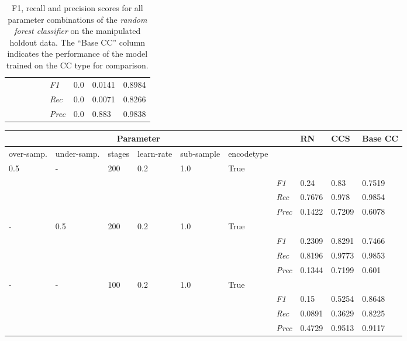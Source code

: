 \begin{table}[H]
\begin{tabularx}{\textwidth}{XXXXX|X|X|X|X}
    & & & & & \textit{F1} & 0.0 & 0.0141    & 0.8984    \\
    & & & & & \textit{Rec} &  0.0 & 0.0071 & 0.8266   \\
    & & & & & \textit{Prec} & 0.0 & 0.883 & 0.9838 \\ \midrule
    \end{tabularx}
    \caption{F1, recall and precision scores for all parameter combinations of the \textit{random forest classifier} on the manipulated holdout data. The \enquote{Base CC} column indicates the performance of the model trained on the CC type for comparison. }
    \label{tab:rq3_random_forest}
    \end{table}
    
    \begin{table}[H]
    \tiny
    \tabcolsep=0.11cm
    \begin{tabularx}{\textwidth}{XXXXXX|X|X|X|X}
    \toprule
    \multicolumn{6}{c}{Parameter} & & RN &  CCS & Base CC \\ \midrule
    over-\newline samp. & under-\newline samp. & stages &learn-\newline rate & sub-\newline sample & encode\newline type & & & & \\ \midrule
    0.5 & - & 200 & 0.2 & 1.0 &True & & & & \\
    & & & & & & \textit{F1} & 0.24 & 0.83   & 0.7519     \\
    & & & & & & \textit{Rec} &  0.7676 & 0.978 & 0.9854   \\
    & & & & & & \textit{Prec} & 0.1422 & 0.7209 & 0.6078 \\ \midrule
    - & 0.5 & 200 & 0.2 & 1.0 &True & & & & \\
    & & & & & & \textit{F1} & 0.2309 & 0.8291   & 0.7466     \\
    & & & & & & \textit{Rec} &  0.8196 & 0.9773 & 0.9853   \\
    & & & & & & \textit{Prec} & 0.1344 & 0.7199 & 0.601 \\ \midrule
    - & - & 100 & 0.2 & 1.0 &True & & & & \\
    & & & & & & \textit{F1} & 0.15 & 0.5254   & 0.8648     \\
    & & & & & & \textit{Rec} &  0.0891 & 0.3629 & 0.8225   \\
    & & & & & & \textit{Prec} & 0.4729 & 0.9513 & 0.9117 \\ \midrule

\end{tabularx}
\end{table}
